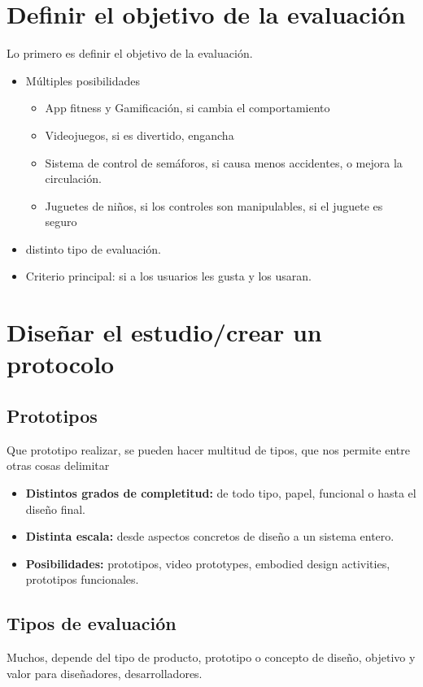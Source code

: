\documentclass[12pt]{report} %
\begin{document}
\section{Definir el objetivo de la evaluación}
Lo primero es definir el objetivo de la evaluación.
\begin{itemize}
  \item Múltiples posibilidades
  \begin{itemize}
    \item App fitness y Gamificación, si cambia el comportamiento
    \item Videojuegos, si es divertido, engancha
    \item Sistema de control de semáforos, si causa menos accidentes, o mejora la circulación.
    \item Juguetes de niños, si los controles son manipulables, si el juguete es seguro
  \end{itemize}
  \item distinto tipo de evaluación.
  \item Criterio principal: si a los usuarios les gusta y los usaran. 
\end{itemize}

\section{Diseñar el estudio/crear un protocolo}
\subsection{Prototipos}
Que prototipo realizar, se pueden hacer multitud de tipos, que nos permite entre otras cosas delimitar
\begin{itemize}
  \item \textbf{Distintos grados de completitud:} de todo tipo, papel, funcional o hasta el diseño final.
  \item \textbf{Distinta escala:} desde aspectos concretos de diseño a un sistema entero.
  \item \textbf{Posibilidades:} prototipos, video prototypes, embodied design activities, prototipos funcionales.
\end{itemize}
      
\subsection{Tipos de evaluación}
Muchos, depende del tipo de producto, prototipo o concepto de diseño, objetivo y valor para diseñadores, desarrolladores.
\end{document}
